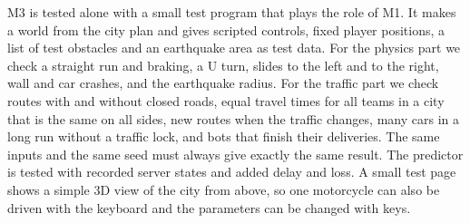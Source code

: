 \documentclass[
  english,
  10pt,
  a4paper,
]{article}
\begin{document}

M3 is tested alone with a small test program that plays the role of M1. It makes a world from the
city plan and gives scripted controls, fixed player positions, a list of test obstacles and an
earthquake area as test data. For the physics part we check a straight run and braking, a U turn,
slides to the left and to the right, wall and car crashes, and the earthquake radius. For the traffic
part we check routes with and without closed roads, equal travel times for all teams in a city that is
the same on all sides, new routes when the traffic changes, many cars in a long run without a traffic
lock, and bots that finish their deliveries. The same inputs and the same seed must always give
exactly the same result. The predictor is tested with recorded server states and added delay and loss.
A small test page shows a simple 3D view of the city from above, so one motorcycle can also be driven
with the keyboard and the parameters can be changed with keys.
\end{document}
